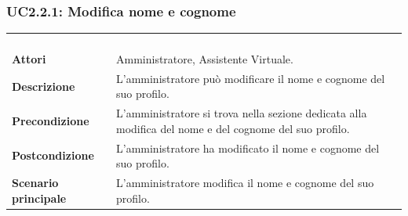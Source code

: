 \subsubsection{UC2.2.1: Modifica nome e cognome}
\label{UC2.2.1}
\begin{longtable}{l|p{10cm}}
	\rowcolor[gray]{0.8} \multicolumn{2}{c}{} \\
	\rowcolor[gray]{0.8} \multicolumn{2}{c}{\textbf{UC2.2.1 - Modifica nome e cognome}} \\
	\rowcolor[gray]{0.8} \multicolumn{2}{c}{} \\
	\hline
	&\\
	\textbf{Attori} & Amministratore, Assistente Virtuale.\\[7pt]
	\textbf{Descrizione} & L'amministratore può modificare il nome e cognome del suo profilo.\\[7pt]
	\textbf{Precondizione} & L'amministratore si trova nella sezione dedicata alla modifica del nome e del cognome del suo profilo.\\[7pt]
	\textbf{Postcondizione} & L'amministratore ha modificato il nome e cognome del suo profilo.\\[7pt]
	\textbf{Scenario principale} &L'amministratore modifica il nome e cognome del suo profilo.\\[7pt]\hline
\end{longtable}

